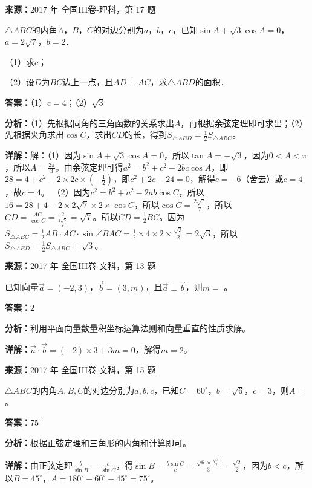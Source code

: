 \begin{question}[points=12]
\textbf{来源：}2017 年 全国III卷-理科，第 17 题\par
$\triangle ABC$的内角$A$，$B$，$C$的对边分别为$a$，$b$，$c$，已知$\sin A+\sqrt{3}\cos A=0$，$a=2\sqrt{7}$，$b=2$．

（1）求$c$；

（2）设$D$为$BC$边上一点，且$AD\perp AC$，求$\triangle ABD$的面积．
\begin{solution}
\textbf{答案：}（1）$c=4$；（2）$\sqrt{3}$

\textbf{分析：}（1）先根据同角的三角函数的关系求出$A$，再根据余弦定理即可求出；（2）先根据夹角求出$\cos C$，求出$CD$的长，得到$S_{\triangle ABD}=\frac{1}{2}S_{\triangle ABC}$。

\textbf{详解：}解：（1）因为$\sin A+\sqrt{3}\cos A=0$，所以$\tan A=-\sqrt{3}$，因为$0<A<\pi$，所以$A=\frac{2\pi}{3}$。由余弦定理可得$a^2=b^2+c^2-2bc\cos A$，即$28=4+c^2-2\times2c\times(-\frac{1}{2})$，即$c^2+2c-24=0$，解得$c=-6$（舍去）或$c=4$，故$c=4$。
（2）因为$c^2=b^2+a^2-2ab\cos C$，所以$16=28+4-2\times2\sqrt{7}\times2\times\cos C$，所以$\cos C=\frac{2\sqrt{7}}{7}$，所以$CD=\frac{AC}{\cos C}=\frac{2}{\frac{2\sqrt{7}}{7}}=\sqrt{7}$。所以$CD=\frac{1}{2}BC$。因为$S_{\triangle ABC}=\frac{1}{2}AB\cdot AC\cdot\sin\angle BAC=\frac{1}{2}\times4\times2\times\frac{\sqrt{3}}{2}=2\sqrt{3}$，所以$S_{\triangle ABD}=\frac{1}{2}S_{\triangle ABC}=\sqrt{3}$。
\end{solution}
\end{question}

\begin{question}[points=5]
\textbf{来源：}2017 年 全国III卷-文科，第 13 题\par
已知向量$\vec{a}=(-2,3)$，$\vec{b}=(3,m)$，且$\vec{a}\perp\vec{b}$，则$m=$        。
\fillin[{$2$}]
\begin{solution}
\textbf{答案：}$2$

\textbf{分析：}利用平面向量数量积坐标运算法则和向量垂直的性质求解。

\textbf{详解：}$\vec{a}\cdot\vec{b}=(-2)\times3+3m=0$，解得$m=2$。
\end{solution}
\end{question}

\begin{question}[points=5]
\textbf{来源：}2017 年 全国III卷-文科，第 15 题\par
$\triangle ABC$的内角$A,B,C$的对边分别为$a,b,c$，已知$C=60^\circ$，$b=\sqrt{6}$，$c=3$，则$A=$        。
\fillin[{$75^\circ$}]
\begin{solution}
\textbf{答案：}$75^\circ$

\textbf{分析：}根据正弦定理和三角形的内角和计算即可。

\textbf{详解：}由正弦定理$\frac{b}{\sin B}=\frac{c}{\sin C}$，得$\sin B=\frac{b\sin C}{c}=\frac{\sqrt{6}\times\frac{\sqrt{3}}{2}}{3}=\frac{\sqrt{2}}{2}$，因为$b<c$，所以$B=45^\circ$，$A=180^\circ-60^\circ-45^\circ=75^\circ$。
\end{solution}
\end{question}

